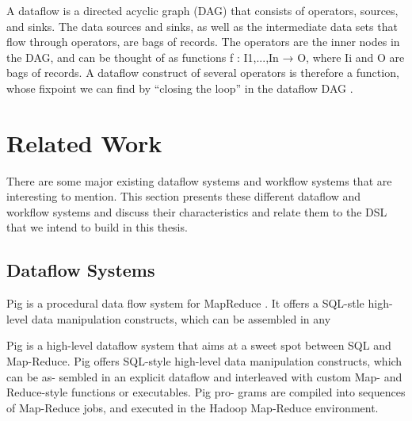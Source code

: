 A dataflow is a directed acyclic graph (DAG) that consists of operators, sources, and sinks. The data sources and sinks, as well as the intermediate data sets that flow through operators, are bags of records. The operators are the inner nodes in the DAG, and can be thought of as functions f : {I1,...,In} → O, where Ii and O are bags of records. A dataflow construct of several operators is therefore a function, whose fixpoint we can find by “closing the loop” in the dataflow DAG \cite{ewen2012spinning}.

\section{Related Work}
There are some major existing dataflow systems and workflow systems that are interesting to mention. This section presents these different dataflow and workflow systems and discuss their characteristics and relate them to the DSL that we intend to build in this thesis. 

\subsection{Dataflow Systems}
Pig is a procedural data flow system for MapReduce \cite{gates2009building}. It offers a SQL-stle high-level data manipulation constructs, which can be assembled in any 

Pig is a high-level dataflow system that aims at a sweet spot between SQL and Map-Reduce. Pig offers SQL-style high-level data manipulation constructs, which can be as- sembled in an explicit dataflow and interleaved with custom Map- and Reduce-style functions or executables. Pig pro- grams are compiled into sequences of Map-Reduce jobs, and executed in the Hadoop Map-Reduce environment.

